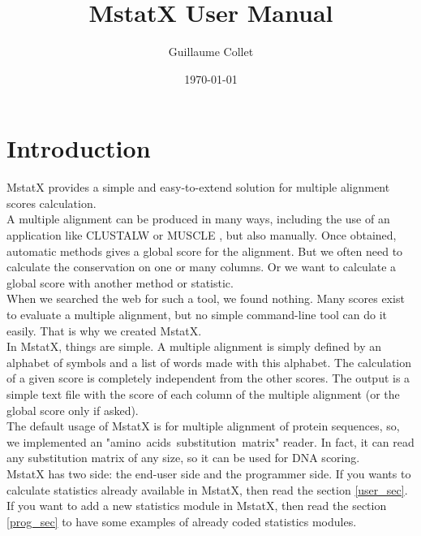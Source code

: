 \documentclass[12pt]{report}
\title{MstatX User Manual}
\author{Guillaume Collet}
\date{\today}
\begin{document}
\maketitle
\thispagestyle{empty} \newpage

\thispagestyle{empty}  \null \newpage

\setcounter{tocdepth}{3}
\tableofcontents
\thispagestyle{empty}
\newpage

\setcounter{page}{1}
\section{Introduction}
MstatX provides a simple and easy-to-extend solution for multiple alignment scores calculation.\\

A multiple alignment can be produced in many ways, including the use of an application like CLUSTALW
\cite{Larkin-2007} or MUSCLE \cite{Edgar0-2004}, but also manually. Once obtained, automatic methods
gives a global score for the alignment. But we often need to calculate the conservation on one or many
columns. Or we want to calculate a global score with another method or statistic.\\

When we searched the web for such a tool, we found nothing. Many scores exist to evaluate a multiple
alignment, but no simple command-line tool can do it easily. That is why we created MstatX.\\

In MstatX, things are simple. A multiple alignment is simply defined by an alphabet of symbols and a list
of words made with this alphabet. The calculation of a given score is completely independent from the
other scores. The output is a simple text file with the score of each column of the multiple alignment (or the
global score only if asked).\\

The default usage of MstatX is for multiple alignment of protein sequences, so, we implemented an "amino~acids~substitution~matrix" reader. In fact, it can read any substitution matrix of any size, so it can
be used for DNA scoring.\\

MstatX has two side: the end-user side and the programmer side.
If you wants to calculate statistics already available in MstatX, then read the section \ref{user_sec}.
If you want to add a new statistics module in MstatX, then read the section \ref{prog_sec} to have some examples of
already coded statistics modules.
\end{document}
